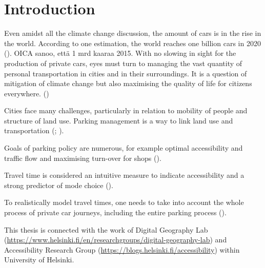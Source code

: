 \section{Introduction}
\justify


Even amidst all the climate change discussion, the amount of cars is in the rise in the world. According to one estimation, the world reaches one billion cars in 2020 (\cite{Sperling2009}). OICA sanoo, että 1 mrd kaaraa 2015. With no slowing in sight for the production of private cars, eyes must turn to managing the vast quantity of personal transportation in cities and in their surroundings. It is a question of mitigation of climate change but also maximising the quality of life for citizens everywhere. (\cite{StatisticsFinland2019Energy2018})

Cities face many challenges, particularly in relation to mobility of people and structure of land use. Parking management is a way to link land use and transportation (\cite{Marsden2006TheReview}; \cite{Diallo2015MethodologyAnalysis}).

Goals of parking policy are numerous, for example optimal accessibility and traffic flow and maximising turn-over for shops (\cite{Marsden2006TheReview}). \par

Travel time is considered an intuitive measure to indicate accessibility and a strong predictor of mode choice (\cite{Frank2008UrbanChoice}).

To realistically model travel times, one needs to take into account the whole process of private car journeys, including the entire parking process (\cite{Salonen2013}).

This thesis is connected with the work of Digital Geography Lab (\textcolor{blue}{\url{https://www.helsinki.fi/en/researchgroups/digital-geography-lab}}) and Accessibility Research Group (\textcolor{blue}{\url{https://blogs.helsinki.fi/accessibility}}) within University of Helsinki.

